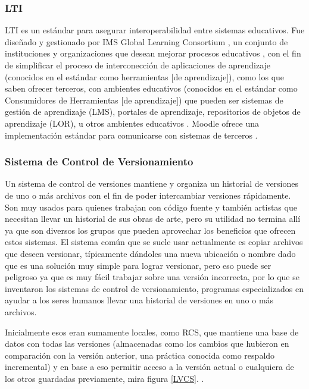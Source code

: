 \subsubsection{LTI}
LTI  es un estándar para asegurar interoperabilidad entre sistemas educativos. Fue diseñado y gestionado por IMS Global Learning Consortium \citep{IMS-Global-LTI}, un conjunto de instituciones y organizaciones que desean mejorar procesos educativos \citep{IMS-Global-Members}, con el fin de simplificar el proceso de interconección de aplicaciones de aprendizaje (conocidos en el estándar como herramientas [de aprendizaje]), como los que saben ofrecer terceros, con ambientes educativos (conocidos en el estándar como Consumidores de Herramientas [de aprendizaje]) que pueden ser sistemas de gestión de aprendizaje (LMS), portales de aprendizaje, repositorios de objetos de aprendizaje (LOR), u otros ambientes educativos \citep{IMS-Global-LTI}. Moodle ofrece una implementación estándar para comunicarse con sistemas de terceros \citep{MOODLE-DOCS-Features}.

\subsubsection{Sistema de Control de Versionamiento}
Un sistema de control de versiones mantiene y organiza un historial de versiones de uno o más archivos con el fin de poder intercambiar versiones rápidamente. Son muy usados para quienes trabajan con código fuente y también artistas \citep{PROGIT-Git-VCS} que necesitan llevar un historial de sus obras de arte, pero su utilidad no termina allí ya que son diversos los grupos que pueden aprovechar los beneficios que ofrecen estos sistemas. El sistema común que se suele usar actualmente es copiar archivos que deseen versionar, típicamente dándoles una nueva ubicación o nombre dado que es una solución muy simple para lograr versionar, pero eso puede ser peligroso ya que es muy fácil trabajar sobre una versión incorrecta, por lo que se inventaron los sistemas de control de versionamiento, programas especializados en ayudar a los seres humanos llevar una historial de versiones en uno o más archivos.

Inicialmente esos eran sumamente locales, como RCS, que mantiene una base de datos con todas las versiones (almacenadas como los cambios que hubieron en comparación con la versión anterior, una práctica conocida como respaldo incremental) y en base a eso permitir acceso a la versión actual o cualquiera de los otros guardadas previamente, mira figura \ref{LVCS}. \citep{PROGIT-Git-VCS}. 

